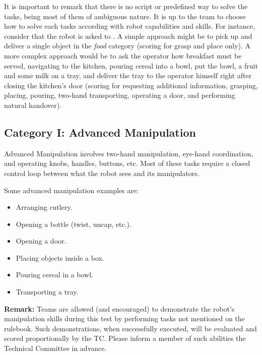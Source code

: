 It is important to remark that there is no script or predefined way to solve the tasks, being most of them of ambiguous nature. It is up to the team to choose how to solve each tasks according with robot capabilities and skills. For instance, consider that the robot is asked to . A simple approach might be to pick up and deliver a single object in the \textit{food} category (scoring for grasp and place only). A more complex approach would be to ask the operator how breakfast must be served, navigating to the kitchen, pouring cereal into a bowl, put the bowl, a fruit and some milk on a tray, and deliver the tray to the operator himself right after closing the kitchen's door (scoring for requesting additional information, grasping, placing, pouring, two-hand transporting, operating a door, and performing natural handover).

%
%
\subsection{Category I: Advanced Manipulation}
\label{sec:eegpsr-categoryI-explained}
Advanced Manipulation involves two-hand manipulation, eye-hand coordination, and operating knobs, handles, buttons, etc. Most of these tasks require a closed control loop between what the robot sees and its manipulators.

Some advanced manipulation examples are:
\begin{itemize}
	\item Arranging cutlery.
	\item Opening a bottle (twist, uncap, etc.).
	\item Opening a door.
	\item Placing objects inside a box.
	\item Pouring cereal in a bowl.
	\item Transporting a tray.
\end{itemize}

\textbf{Remark:} Teams are allowed (and encouraged) to demonstrate the robot's manipulation skills during this test by performing tasks not mentioned on the rulebook. Such demonstrations, when successfully executed, will be evaluated and scored proportionally by the TC. Please inform a member of such abilities the Technical Committee in advance.

